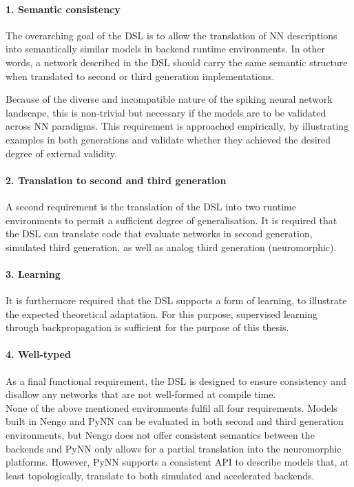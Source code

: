 \documentclass[report.tex]{subfiles}
\begin{document}
\paragraph{1. Semantic consistency}
The overarching goal of the \gls{DSL} is to allow the translation 
of \gls{NN} descriptions into semantically similar models in backend runtime
environments.
In other words, a network described in the \gls{DSL} should carry
the same semantic structure when translated to second or third generation
implementations. 

Because of the diverse and incompatible nature of the spiking neural network
landscape, this is non-trivial but necessary if the models are to be
validated across \gls{NN} paradigms.
This requirement is approached empirically, by illustrating examples in
both generations and validate whether they achieved the desired degree
of external validity.

\paragraph{2. Translation to second and third generation}
A second requirement is the translation of the \gls{DSL} into
two runtime environments to permit a sufficient degree of
generalisation.
It is required that the DSL can translate code that evaluate networks
in second generation, simulated third generation, as well as
analog third generation (neuromorphic).

\paragraph{3. Learning}
It is furthermore required that the \gls{DSL} supports a form of
learning, to illustrate the expected theoretical adaptation.
For this purpose, supervised learning through backpropagation
is sufficient for the purpose of this thesis.

\paragraph{4. Well-typed}
As a final functional requirement, the \gls{DSL} is designed to ensure
consistency and disallow any networks that are not well-formed at
compile time.
\\[0.4cm]
\noindent
None of the above mentioned environments fulfil all four requirements.
Models built in Nengo and PyNN can be evaluated
in both second and third generation environments, but Nengo does not 
offer consistent semantics between the backends and PyNN only allows
for a partial translation into the neuromorphic platforms.
However, PyNN supports a consistent \gls{API} to describe models that, at
least topologically, translate to both simulated and accelerated 
backends.
\end{document}
